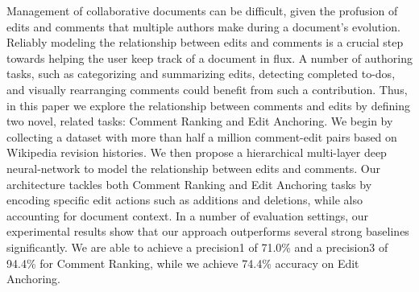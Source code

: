 Management of collaborative documents can be difficult, given the profusion of edits and comments that multiple authors make during a document's evolution. Reliably modeling the relationship between edits and comments is a crucial step towards helping the user keep track of a document in flux. A number of authoring tasks, such as categorizing and summarizing edits, detecting completed to-dos, and visually rearranging comments could benefit from such a contribution. Thus, in this paper we explore the relationship between comments and edits by defining two novel, related tasks: Comment Ranking and Edit Anchoring. We begin by collecting a dataset with more than half a million comment-edit pairs based on Wikipedia revision histories. We then propose a hierarchical multi-layer deep neural-network to model the relationship between edits and comments. Our architecture tackles both Comment Ranking and Edit Anchoring tasks by encoding specific edit actions such as additions and deletions, while also accounting for document context. In a number of evaluation settings, our experimental results show that our approach outperforms several strong baselines significantly. We are able to achieve a precision\@1 of 71.0\% and a precision\@3 of 94.4\% for Comment Ranking, while we achieve 74.4\% accuracy on Edit Anchoring.